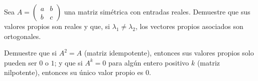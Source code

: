 \begin{prob}
Sea $A=\begin{pmatrix} a & b \\ b & c \end{pmatrix}$ una matriz simétrica con entradas reales. Demuestre que sus valores propios son reales y que, si $\lambda_1\neq\lambda_2$, los vectores propios asociados son ortogonales.
\end{prob}

\begin{prob}
Demuestre que si $A^{2}=A$ (matriz idempotente), entonces sus valores propios solo pueden ser $0$ o $1$; y que si $A^{k}=0$ para algún entero positivo $k$ (matriz nilpotente), entonces su único valor propio es $0$.
\end{prob}
